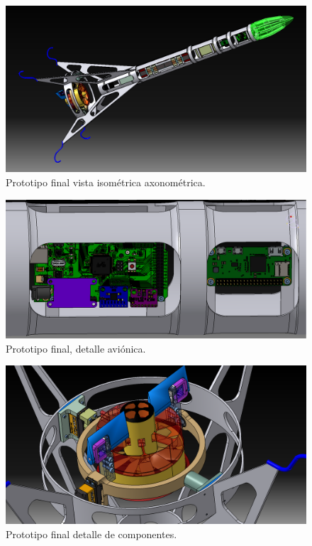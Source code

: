 \begin{figure}[htb]
    \centering
    \includegraphics[width=0.8\linewidth]{fig/design/v6_2}
    \caption{Prototipo final vista isométrica axonométrica.}
    \label{fig:design/v6_2}
\end{figure}



\begin{figure}[htb]
    \centering
    \includegraphics[width=0.8\linewidth]{fig/design/v6_4}
    \caption{Prototipo final, detalle aviónica.}
    \label{fig:design/v6_4}
\end{figure}


\begin{figure}[htb]
    \centering
    \includegraphics[width=0.8\linewidth]{fig/design/v6_6}
    \caption{Prototipo final detalle de componentes.}
    \label{fig:design/v6_6}
\end{figure}

